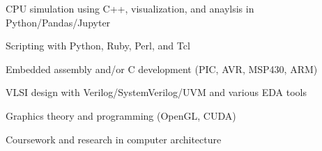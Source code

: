 \begin{plainlist}
	\item CPU simulation using C++, visualization, and anaylsis in Python/Pandas/Jupyter
        \item Scripting with Python, Ruby, Perl, and Tcl
	\item Embedded assembly and/or C development (PIC, AVR, MSP430, ARM)
	\item VLSI design with Verilog/SystemVerilog/UVM and various EDA tools
	\item Graphics theory and programming (OpenGL, CUDA)
	\item Coursework and research in computer architecture
\end{plainlist}

